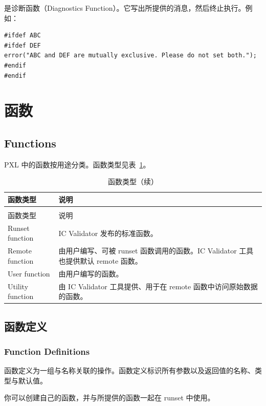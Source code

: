  是诊断函数（Diagnostics Function）。它写出所提供的消息，然后终止执行。例如：
\begin{lstlisting}[style=pxl]
#ifdef ABC
#ifdef DEF
error("ABC and DEF are mutually exclusive. Please do not set both.");
#endif
#endif
\end{lstlisting}

\section{函数}
\subsection*{Functions}

PXL 中的函数按用途分类。函数类型见表~\ref{tab:pxl-func-types}。

\begin{longtable}{@{}>{\raggedright\arraybackslash}p{} p{}@{}}
\caption{函数类型}\label{tab:pxl-func-types}\\
\toprule
函数类型 & 说明 \\
\midrule
\endfirsthead
\caption[]{函数类型（续）}\\
\toprule
函数类型 & 说明 \\
\midrule
\endhead
\bottomrule
\endfoot
Runset function & IC Validator 发布的标准函数。 \\
Remote function & 由用户编写、可被 runset 函数调用的函数。IC Validator 工具也提供默认 remote 函数。 \\
User function & 由用户编写的函数。 \\
Utility function & 由 IC Validator 工具提供、用于在 remote 函数中访问原始数据的函数。 \\
\end{longtable}

\subsection{函数定义}
\subsubsection*{Function Definitions}

函数定义为一组与名称关联的操作。函数定义标识所有参数以及返回值的名称、类型与默认值。

你可以创建自己的函数，并与所提供的函数一起在 runset 中使用。

